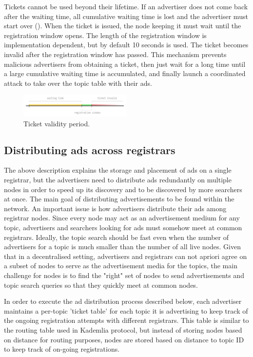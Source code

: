 Tickets cannot be used beyond their lifetime. If an advertiser does not come back after the waiting time, all cumulative waiting time is lost and the advertiser must start over (). When the ticket is issued, the node keeping it must wait until the registration window opens. The length of the registration window is implementation dependent, but by default 10 seconds is used. The ticket becomes invalid after the registration window has passed. This mechanism prevents malicious advertisers from obtaining a ticket, then just wait for a long time until a large cumulative waiting time is accumulated, and finally launch a coordinated attack to take over the topic table with their ads.
    
\begin{figure}
    \includegraphics[width=0.5\textwidth]{img/ticket-validity}
    \caption{Ticket validity period.}
    \label{fig:ticket_validity}
\end{figure}

\subsection{Distributing ads across registrars}

The above description explains the storage and placement of ads on a single registrar, but the advertisers need to distribute ads redundantly on multiple nodes in order to speed up its discovery and to be discovered by more searchers at once. 
The main goal of distributing advertisements to be found within the network. An important issue is how advertisers distribute their ads among registrar nodes. 
Since every node may act as an advertisement medium for any topic,  advertisers and searchers looking for ads must somehow meet at common registrars. 
Ideally, the topic search should be fast even when the number of advertisers for a topic is much smaller than the number of all live nodes. Given that in a decentralised setting, advertisers and registrars can not apriori agree on a subset of nodes to serve as the advertisement media for the topics, the main challenge for nodes is to find the "right" set of nodes to send advertisements and topic search queries so that they quickly meet at common nodes.

In order to execute the ad distribution process described below,  each advertiser maintains a per-topic 'ticket table' for each topic it is advertising to keep track of the ongoing registration attempts with different registrars. 
This table is similar to the routing table used in Kademlia protocol, but instead of storing nodes based on distance for routing purposes, nodes are stored based on distance to topic ID to keep track of on-going registrations.

